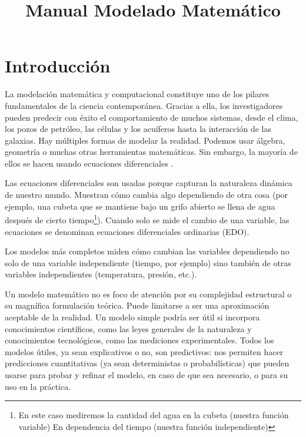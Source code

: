 \documentclass[11pt, letterpaper, spanish]{article}
\begin{document}
\title{Manual Modelado Matemático}


\nocite{*}

\newpage

\tableofcontents

\newpage
\section{Introducción}
\par{La modelación matemática y computacional constituye uno de los pilares fundamentales de la ciencia contemporánea. Gracias a ella, los investigadores pueden predecir con éxito el comportamiento de muchos sistemas, desde el clima, los pozos de petróleo, las células y los acuíferos hasta la interacción de las galaxias. Hay múltiples formas de modelar la realidad. Podemos usar álgebra, geometría o muchas otras herramientas matemáticas. Sin embargo, la mayoría de ellos se hacen usando ecuaciones diferenciales \cite{castillo_2012}.}

\par{Las ecuaciones diferenciales son usadas porque capturan la naturaleza dinámica de nuestro mundo. Muestran cómo cambia algo dependiendo de otra cosa (por ejemplo, una cubeta que se mantiene bajo un grifo abierto se llena de agua después de cierto tiempo\footnote{En este caso mediremos la cantidad del agua en la cubeta (nuestra función variable) En dependencia del tiempo (nuestra función independiente)}). Cuando solo se mide el cambio de una variable, las ecuaciones se denominan ecuaciones diferenciales ordinarias (EDO).}

\par{Los modelos más completos miden cómo cambian las variables dependiendo no solo de una variable independiente (tiempo, por ejemplo) sino también de otras variables independientes (temperatura, presión, etc.).}

\par{Un modelo matemático no es foco de atención por su complejidad estructural o su magnífica formulación teórica. Puede limitarse a ser una aproximación aceptable de la realidad. Un modelo simple podría ser útil si incorpora conocimientos científicos, como las leyes generales de la naturaleza y conocimientos tecnológicos, como las mediciones experimentales. Todos los modelos útiles, ya sean explicativos o no, son predictivos: nos permiten hacer predicciones cuantitativas (ya sean deterministas o probabilísticas) que pueden usarse para probar y refinar el modelo, en caso de que sea necesario, o para su uso en la práctica.}
\end{document}
